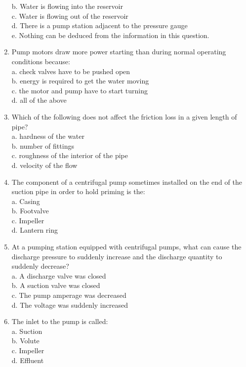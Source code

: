 \begin{enumerate}[1.]
b. Water is flowing into the reservoir\\

c. Water is flowing out of the reservoir\\

d. There is a pump station adjacent to the pressure gauge\\

e. Nothing can be deduced from the information in this question.\\

\item Pump motors draw more power starting than during normal operating conditions because:\\
a.	check valves have to be pushed open\\
b.	energy is required to get the water moving\\
c.	the motor and pump have to start turning\\
d.	all of the above

\item Which of the following does not affect the friction loss in a given length of pipe?\\
a.	hardness of the water\\
b.	number of fittings\\
c.	roughness of the interior of the pipe\\
d.	velocity of the flow\\

\item The component of a centrifugal pump sometimes installed on the end of the suction pipe in order to hold priming is the:\\
a. Casing\\
b. Footvalve\\
c. Impeller\\
d. Lantern ring\\

\item At a pumping station equipped with centrifugal pumps, what can cause the discharge pressure to suddenly increase and the discharge quantity to suddenly decrease?\\
a. A discharge valve was closed\\
b. A suction valve was closed\\
c. The pump amperage was decreased\\
d. The voltage was suddenly increased


\item The inlet to the pump is called:\\
a. Suction\\
b. Volute\\
c. Impeller\\
d. Effluent\\


\end{enumerate}
